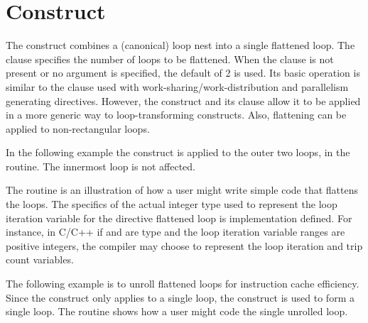 \section{ Construct}
\label{sec:flatten}

The  construct combines a (canonical) loop nest into a single flattened loop.
The  clause specifies the number of loops to be flattened. 
When the  clause is not present or no argument is specified,
the default of 2 is used.  Its basic operation is similar to the  
clause used with work-sharing/work-distribution and parallelism generating directives.
However, the  construct and its  clause allow 
it to be applied in a more generic way to loop-transforming constructs. 
Also, flattening can be applied to non-rectangular loops.

In the following example the  construct is applied to the outer two loops,
in the  routine.  The innermost  loop is not affected.

The  routine is an illustration of how a user might 
write simple code that flattens the loops.
The specifics of the actual integer type used to represent the loop iteration variable 
for the directive flattened loop is implementation defined.
For instance, in C/C++ if  and  are  type and the loop 
iteration variable ranges are positive integers, the compiler may choose 
 to represent the loop iteration
 and trip count  variables.


The following example is to unroll flattened loops for instruction cache efficiency.
Since the  construct only applies to a single loop, 
the  construct is used to form a single loop.
The  routine shows how a user might code the single unrolled loop.



